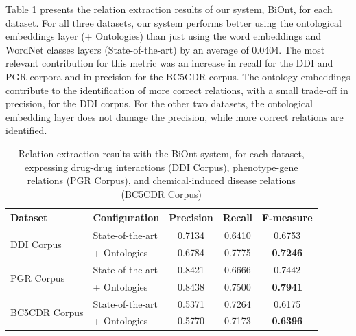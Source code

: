 Table \ref{tab32} presents the relation extraction results of our system, BiOnt, for each dataset. For all three datasets, our system performs better using the ontological embeddings layer (+ Ontologies) than just using the word embeddings and WordNet classes layers (State-of-the-art) by an average of 0.0404. The most relevant contribution for this metric was an increase in recall for the DDI and PGR corpora and in precision for the BC5CDR corpus. The ontology embeddings contribute to the identification of more correct relations, with a small trade-off in precision, for the DDI corpus. For the other two datasets, the ontological embedding layer does not damage the precision, while more correct relations are identified.

\begin{table}[h]
\centering
\caption[Relation Extraction Results with the BiOnt System]{Relation extraction results with the BiOnt system, for each dataset, expressing drug-drug interactions (DDI Corpus), phenotype-gene relations (PGR Corpus), and chemical-induced disease relations (BC5CDR Corpus)}\label{tab32}
\begin{tabular}{llccc}\hline
Dataset & Configuration & Precision & Recall & F-measure \\
\hline
\multirow{2}{*}{DDI Corpus} & State-of-the-art & 0.7134 & 0.6410 & 0.6753 \\
&  + Ontologies & 0.6784 & 0.7775 & \textbf{0.7246} \\
\hline
\multirow{2}{*}{PGR Corpus} & State-of-the-art & 0.8421 & 0.6666 & 0.7442 \\
& + Ontologies & 0.8438 & 0.7500 & \textbf{0.7941} \\
\hline
\multirow{2}{*}{BC5CDR Corpus} & State-of-the-art & 0.5371 & 0.7264 & 0.6175 \\
& + Ontologies & 0.5770 & 0.7173 & \textbf{0.6396} \\
\hline
\end{tabular}
\end{table}


